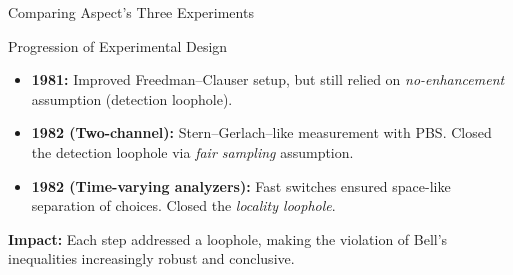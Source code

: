 \begin{frame}{Comparing Aspect’s Three Experiments}

\begin{block}{Progression of Experimental Design}
\begin{itemize}
  \item \textbf{1981:} Improved Freedman–Clauser setup, but still relied on \textit{no-enhancement} assumption (detection loophole).  
  \pause
  \item \textbf{1982 (Two-channel):} Stern–Gerlach–like measurement with PBS. Closed the detection loophole via \textit{fair sampling} assumption.  
  \pause
  \item \textbf{1982 (Time-varying analyzers):} Fast switches ensured space-like separation of choices. Closed the \textit{locality loophole}.  
\end{itemize}
\end{block}

\pause

\begin{center}
  \textbf{Impact:} Each step addressed a loophole, making the violation of Bell’s inequalities increasingly robust and conclusive.  
\end{center}

\end{frame}


